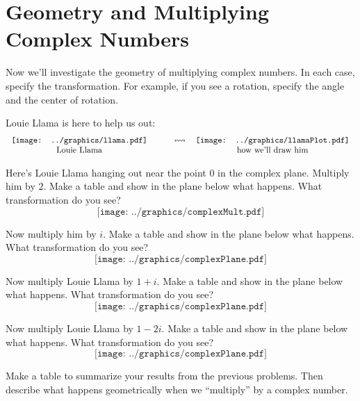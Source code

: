 \newpage
\section{Geometry and Multiplying Complex Numbers}\label{A:complexMultiplication}

Now we'll investigate the geometry of multiplying complex
numbers. In each case, specify the transformation.  For example, if you see a rotation, specify the angle and the center of rotation.  

Louie Llama is here to help us out:
\[
\begin{tabular}{ccc}
\texttt{[image: ../graphics/llama.pdf]} & \qquad $\leftrightsquigarrow$\qquad& \texttt{[image: ../graphics/llamaPlot.pdf]}\\
Louie Llama & & how we'll draw him
\end{tabular}
\]

\begin{prob} 
Here's Louie Llama hanging out near the point $0$ in the complex
plane. Multiply him by $2$. Make a table and show in the plane below what happens.  What transformation do you see?  
\[
\texttt{[image: ../graphics/complexMult.pdf]}
\]
\end{prob}

\break

\begin{prob} 
Now multiply him by $i$. Make a table and show in the plane below what happens.  What transformation do you see?  
\[
\texttt{[image: ../graphics/complexPlane.pdf]}
\]
\end{prob}

\vfill

\begin{prob} 
Now multiply Louie Llama by $1+i$. Make a table and show in the plane
below what happens.  What transformation do you see?  
\[
\texttt{[image: ../graphics/complexPlane.pdf]}
\]
\end{prob}

\vfill


\begin{prob} 
Now multiply Louie Llama by $1 - 2i$. Make a
table and show in the plane below what happens.  What transformation do you see?  
\[
\texttt{[image: ../graphics/complexPlane.pdf]}
\]
\end{prob}




\begin{prob}
Make a table to summarize your results from the previous problems.  
Then describe what happens geometrically when we ``multiply''  by a complex
number. 
\end{prob}

